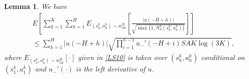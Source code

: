\documentclass[11pt]{article}
\newtheorem{lemma}{Lemma}
\newcommand{\1}{\mathbbm{1}}
\begin{document}
\begin{lemma}\label{L13}  
We have
\begin{align}\label{EQ25}
& E\left [\sum_{k=1}^K\sum_{h=1}^H E_{(s_h^k,a_h^k)\sim w_{hk}^{B}}\left [\frac{\vert u(-H+h)\vert}{\sqrt{\max\{1,N_h^k(s_h^k,a_h^k)\}}}\right ]\right ]\nonumber\\
&\leq \sum_{h=1}^H \vert u(-H+h)\vert  \sqrt{\prod\limits_{i=1}^{h-1} u_{-}'(-H+i)SAK\log(3K)},
\end{align}
where $E_{(s_h^k,a_h^k)\sim w_{hk}^{B}}[\cdot]$ given in \eqref{LS10} is taken over $(s_h^k,a_h^k)$ conditional on $(s_1^k,a_1^k)$ and $u_{-}'(\cdot)$ is the left derivative of $u$.
\end{lemma}
\end{document}
